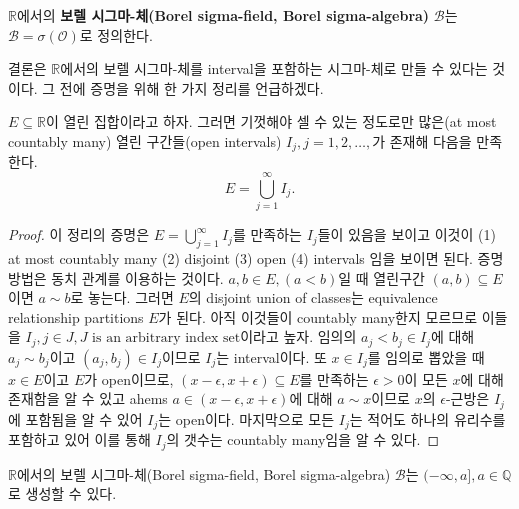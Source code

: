 \documentclass[b5paper,]{scrbook}
\theoremstyle{plain}
\theoremstyle{definition}
\numberwithin{equation}{section}
\let\BeginKnitrBlock\begin \let\EndKnitrBlock\end
\begin{document}
\BeginKnitrBlock{definition}[보렐 시그마-체]
\protect\hypertarget{def:unnamed-chunk-36}{}{\label{def:unnamed-chunk-36}
{} }\(\mathbb{R}\)에서의 \textbf{보렐
시그마-체(Borel sigma-field, Borel sigma-algebra)} \(\mathcal{B}\)는
\(\mathcal{B}=\sigma(\mathcal{O})\)로 정의한다.
\EndKnitrBlock{definition}

결론은 \(\mathbb{R}\)에서의 보렐 시그마-체를 interval을 포함하는
시그마-체로 만들 수 있다는 것이다. 그 전에 증명을 위해 한 가지 정리를
언급하겠다.

\BeginKnitrBlock{theorem}[열린 집합과 열린 구간들]
\protect\hypertarget{thm:unnamed-chunk-37}{}{\label{thm:unnamed-chunk-37}
{} }\(E \subseteq \mathbb{R}\)이
열린 집합이라고 하자. 그러면 기껏해야 셀 수 있는 정도로만 많은(at most
countably many) 열린 구간들(open intervals) \(I_{j}, j=1,2,\ldots,\)가
존재해 다음을 만족한다. \[E=\bigcup_{j=1}^{\infty}I_{j}.\]
\EndKnitrBlock{theorem}

\BeginKnitrBlock{proof}
{}이 정리의 증명은
\(E=\bigcup_{j=1}^{\infty}I_{j}\)를 만족하는 \(I_{j}\)들이 있음을 보이고
이것이 (1) at most countably many (2) disjoint (3) open (4) intervals
임을 보이면 된다. 증명 방법은 동치 관계를 이용하는 것이다.
\(a, b \in E, (a < b)\)일 때 열린구간 \((a,b)\subseteq E\)이면
\(a \sim b\)로 놓는다. 그러면 \(E\)의 disjoint union of classes는
equivalence relationship partitions \(E\)가 된다. 아직 이것들이
countably many한지 모르므로 이들을
\(I_{j}, j\in J, J \text{ is an arbitrary index set}\)이라고 높자.
임의의 \(a_{j}<b_{j}\in I_{j}\)에 대해 \(a_{j} \sim b_{j}\)이고
\((a_{j}, b_{j}) \in I_{j}\)이므로 \(I_{j}\)는 interval이다. 또
\(x\in I_{j}\)를 임의로 뽑았을 때 \(x\in E\)이고 \(E\)가 open이므로,
\((x-\epsilon, x+\epsilon)\subseteq E\)를 만족하는 \(\epsilon >0\)이
모든 \(x\)에 대해 존재함을 알 수 있고 ahems
\(a\in (x-\epsilon, x+\epsilon)\)에 대해 \(a \sim x\)이므로 \(x\)의
\(\epsilon\)-근방은 \(I_{j}\)에 포함됨을 알 수 있어 \(I_{j}\)는
open이다. 마지막으로 모든 \(I_{j}\)는 적어도 하나의 유리수를 포함하고
있어 이를 통해 \(I_{j}\)의 갯수는 countably many임을 알 수 있다.
\EndKnitrBlock{proof}

\BeginKnitrBlock{theorem}[실수 구간에서의 보렐 시그마-체의 생성]
\protect\hypertarget{thm:unnamed-chunk-39}{}{\label{thm:unnamed-chunk-39}
{}
}\(\mathbb{R}\)에서의 보렐 시그마-체(Borel sigma-field, Borel
sigma-algebra) \(\mathcal{B}\)는 \((-\infty, a], a\in\mathbb{Q}\)로
생성할 수 있다.
\EndKnitrBlock{theorem}
\end{document}
